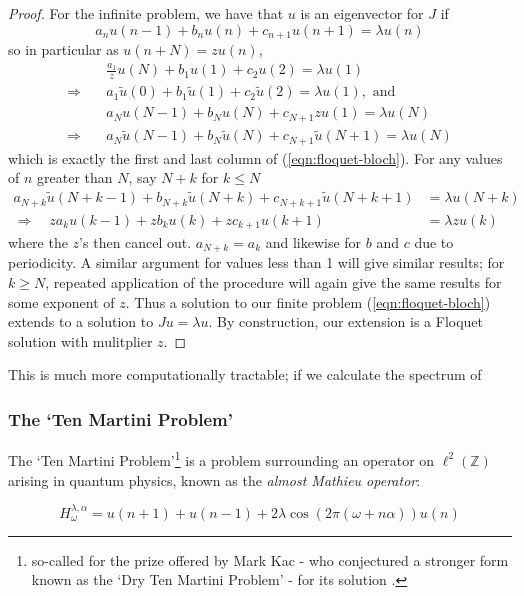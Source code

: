 \documentclass[../main.tex]{subfiles}
\begin{document}
\begin{proof}
For the infinite problem, we have that $u$ is an eigenvector for $J$ if
$$a_n u(n-1) + b_n u(n) + c_{n+1} u(n+1) = \lambda u(n)$$
so in particular as $u(n + N) = z u(n)$,
\begin{align*}
& \frac{a_1}{z} u(N) + b_1 u(1) + c_2 u(2) = \lambda u(1)\\
\Rightarrow \quad& a_1 \tilde{u}(0) + b_1 \tilde{u}(1) + c_2 \tilde{u}(2) = \lambda u(1), \text{ and } \\
& a_N u(N-1) + b_N u(N) + c_{N+1} z u(1) = \lambda u(N)\\
\Rightarrow \quad& a_N \tilde{u}(N-1) + b_N \tilde{u}(N) + c_{N+1} \tilde{u}(N+1) = \lambda u(N)
\end{align*}
which is exactly the first and last column of (\ref{eqn:floquet-bloch}). For any values of $n$ greater than $N$, say $N + k$ for $k \leq N$
\begin{align*}
a_{N+k} \tilde{u}(N+k-1) + b_{N+k} \tilde{u}(N+k) + c_{N+k+1} \tilde{u}(N+k+1) & = \lambda u(N+k) \\
\Rightarrow \quad z a_{k} u(k-1) + z b_{k} u(k) + z c_{k+1} u(k+1) & = \lambda z u(k)
 \end{align*}
where the $z$'s then cancel out. $a_{N+k} = a_{k}$ and likewise for $b$ and $c$ due to periodicity. A similar argument for values less than 1 will give similar results; for $k \geq N$, repeated application of the procedure will again give the same results for some exponent of $z$. Thus a solution to our finite problem (\ref{eqn:floquet-bloch}) extends to a solution to $Ju = \lambda u$. By construction, our extension is a Floquet solution with mulitplier $z$.
\end{proof}

This is much more computationally tractable; if we calculate the spectrum of 

\subsubsection{The `Ten Martini Problem'}
The `Ten Martini Problem'\footnote{so-called for the prize offered by Mark Kac - who conjectured a stronger form known as the `Dry Ten Martini Problem' - for its solution \cite{simon1982almost}.} is a problem surrounding an operator on $\ell^2(\mathbb{Z})$ arising in quantum physics, known as the \emph{almost Mathieu operator}:

$$H_\omega^{\lambda, \alpha} = u(n+1) + u(n-1) + 2\lambda \cos(2\pi (\omega + n \alpha))u(n)$$
\end{document}
